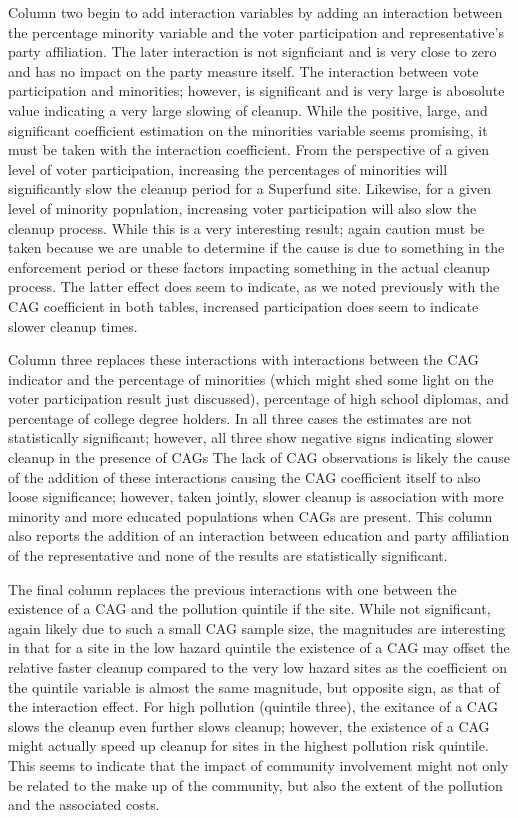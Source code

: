 \documentclass[12pt]{article}
\begin{document}
{Column two begin to add interaction variables by adding an interaction between the percentage minority variable and the voter participation and representative's party affiliation. The later interaction is not signficiant and is very close to zero and has no impact on the party measure itself. The interaction between vote participation and minorities; however, is significant and is very large is abosolute value indicating a very large slowing of cleanup. While the positive, large, and significant coefficient estimation on the minorities variable seems promising, it must be taken with the interaction coefficient. From the perspective of a given level of voter participation, increasing the percentages of minorities will significantly slow the cleanup period for a Superfund site. Likewise, for a given level of minority population, increasing voter participation will also slow the cleanup process. While this is a very interesting result; again caution must be taken because we are unable to determine if the cause is due to something in the enforcement period or these factors impacting something in the actual cleanup process. The latter effect does seem to indicate, as we noted previously with the CAG coefficient in both tables, increased participation does seem to indicate slower cleanup times. 

Column three replaces these interactions with interactions between the CAG indicator and the percentage of minorities (which might shed some light on the voter participation result just discussed), percentage of high school diplomas, and percentage of college degree holders. In all three cases the estimates are not statistically significant; however, all three show negative signs indicating slower cleanup in the presence of CAGs The lack of CAG observations is likely the cause of the addition of these interactions causing the CAG coefficient itself to also loose significance; however, taken jointly, slower cleanup is association with more minority and more educated populations when CAGs are present. This column also reports the addition of an interaction between education and party affiliation of the representative and none of the results are statistically significant.

The final column replaces the previous interactions with one between the existence of a CAG and the pollution quintile if the site. While not significant, again likely due to such a small CAG sample size, the magnitudes are interesting in that for a site in the low hazard quintile the existence of a CAG may offset the relative faster cleanup compared to the very low hazard sites as the coefficient on the quintile variable is almost the same magnitude, but opposite sign, as that of the interaction effect. For high pollution (quintile three), the exitance of a CAG slows the cleanup even further slows cleanup; however, the existence of a CAG might actually speed up cleanup for sites in the highest pollution risk quintile. This seems to indicate that the impact of community involvement might not only be related to the make up of the community, but also the extent of the pollution and the associated costs. 

}
\end{document}
